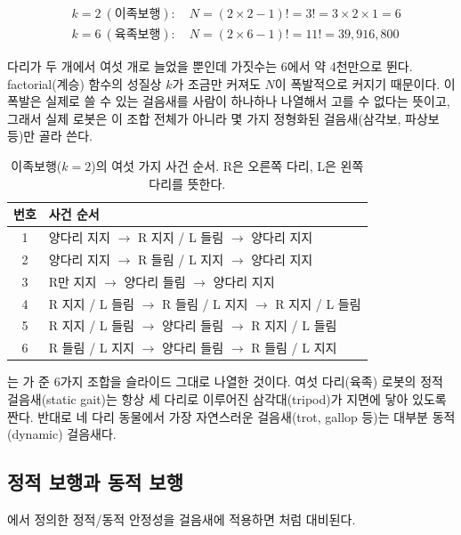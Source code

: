 \begin{align*}
&k=2 \ (\text{이족보행}): \quad N = (2\times2-1)! = 3! = 3\times2\times1 = 6 \\
&k=6 \ (\text{육족보행}): \quad N = (2\times6-1)! = 11! = 39{,}916{,}800
\end{align*}

다리가 두 개에서 여섯 개로 늘었을 뿐인데 가짓수는 6에서 약 4천만으로 뛴다.
factorial(계승) 함수의 성질상 $k$가 조금만 커져도 $N$이 폭발적으로 커지기
때문이다. 이 폭발은 실제로 쓸 수 있는 걸음새를 사람이 하나하나 나열해서 고를 수
없다는 뜻이고, 그래서 실제 로봇은 이 조합 전체가 아니라 몇 가지 정형화된
걸음새(삼각보, 파상보 등)만 골라 쓴다.

\begin{table}[ht]
\centering
\caption{이족보행($k=2$)의 여섯 가지 사건 순서. R은 오른쪽 다리, L은 왼쪽
  다리를 뜻한다.}
\label{tab:lec02-biped-gaits}
\begin{tabularx}{\linewidth}{@{}cL@{}}
\toprule
번호 & 사건 순서 \\
 & 양다리 지지 $\to$ R 지지 / L 들림 $\to$ 양다리 지지 \\
2 & 양다리 지지 $\to$ R 들림 / L 지지 $\to$ 양다리 지지 \\
3 & R만 지지 $\to$ 양다리 들림 $\to$ 양다리 지지 \\
4 & R 지지 / L 들림 $\to$ R 들림 / L 지지 $\to$ R 지지 / L 들림 \\
5 & R 지지 / L 들림 $\to$ 양다리 들림 $\to$ R 지지 / L 들림 \\
6 & R 들림 / L 지지 $\to$ 양다리 들림 $\to$ R 들림 / L 지지 \\
\bottomrule
\end{tabularx}
\end{table}

는 가 준 6가지 조합을 슬라이드
그대로 나열한 것이다. 여섯 다리(육족) 로봇의 정적 걸음새(static gait)는 항상 세
다리로 이루어진 삼각대(tripod)가 지면에 닿아 있도록 짠다. 반대로 네 다리
동물에서 가장 자연스러운 걸음새(trot, gallop 등)는 대부분 동적(dynamic)
걸음새다.

\subsection{정적 보행과 동적 보행}
\label{sec:lec02-static-dynamic}

에서 정의한 정적/동적 안정성을 걸음새에 적용하면
처럼 대비된다.

